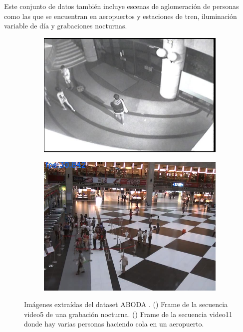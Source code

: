 Este conjunto de datos también incluye escenas de aglomeración de personas como las que se encuentran en aeropuertos y estaciones de tren, iluminación variable de día y grabaciones nocturnas.

\begin{figure}[ht]
  \centering
  \begin{subfigure}[b]{0.4\textwidth}
    \includegraphics[width=\textwidth]{img/chapters/resultados/datasets/aboda_3.jpg}
    \caption{}
    \label{fig:aboda_3}
  \end{subfigure}
  \qquad\qquad
  \begin{subfigure}[b]{0.4\textwidth}
    \includegraphics[width=\textwidth]{img/chapters/resultados/datasets/aboda_4.jpg}
    \caption{}
    \label{fig:aboda_4}
  \end{subfigure}
  \caption{Imágenes extraídas del dataset ABODA \cite{aboda-dataset}.
    (\protect{}) Frame de la secuencia video5 de una grabación nocturna.
    (\protect{}) Frame de la secuencia video11 donde hay varias personas haciendo cola en un aeropuerto.}
  \label{fig:aboda2}
\end{figure}

